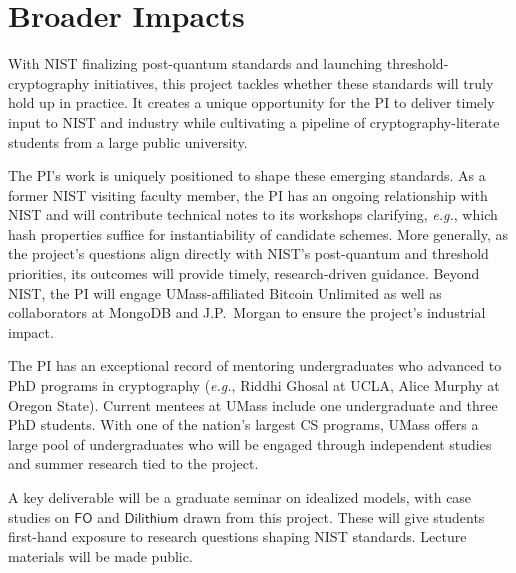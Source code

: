 






 \section{Broader Impacts} \label{sec-outreach}
With NIST finalizing post-quantum standards and launching threshold-cryptography initiatives, this project tackles whether these standards will truly hold up in practice. It creates a unique opportunity for the PI to deliver timely input to NIST and industry while cultivating a pipeline of cryptography-literate students from a large public university.

The PI’s work is uniquely positioned to shape these emerging standards. As a former NIST visiting 
faculty member, the PI has an ongoing relationship with NIST and will contribute  
technical notes to its workshops clarifying, \emph{e.g.}, which hash properties suffice for 
instantiability of candidate schemes. More generally, as the project’s questions align directly with NIST’s 
post-quantum and threshold priorities, its outcomes will provide timely, research-driven guidance. 
Beyond NIST, the PI will engage UMass-affiliated Bitcoin Unlimited as well as collaborators at 
MongoDB and J.P.~Morgan to ensure the project’s industrial impact.





The PI has an exceptional record of mentoring undergraduates who advanced to PhD programs in cryptography  
(\emph{e.g.}, Riddhi Ghosal at UCLA, Alice Murphy at Oregon State). Current mentees at UMass include 
one undergraduate and three PhD students. With one of the nation’s largest CS programs, UMass offers 
a large pool of undergraduates who will be engaged through independent studies and summer research tied to the project.

A key deliverable will be a graduate seminar on idealized models, with case studies on 
$\mathsf{FO}$ and $\mathsf{Dilithium}$ drawn from this project. These will give students 
first-hand exposure to research questions shaping NIST standards. Lecture materials 
will be made public.

